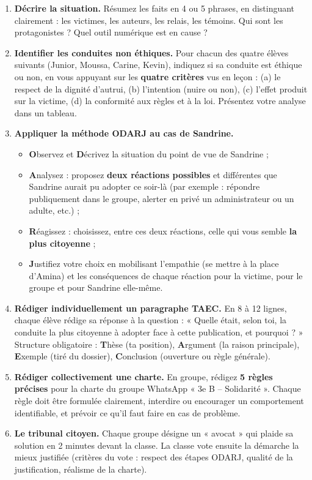 \documentclass[11pt]{article}
\newcommand{\cle}[1]{{\popxbold\color{popdark}#1}}
\begin{document}
\begin{enumerate}
\item \textbf{Décrire la situation.} Résumez les faits en 4 ou 5 phrases, en distinguant clairement : les victimes, les auteurs, les relais, les témoins. Qui sont les protagonistes ? Quel outil numérique est en cause ?

\item \textbf{Identifier les conduites non éthiques.} Pour chacun des quatre élèves suivants (Junior, Moussa, Carine, Kevin), indiquez si sa conduite est éthique ou non, en vous appuyant sur les \textbf{quatre critères} vus en leçon : (a) le respect de la dignité d'autrui, (b) l'intention (nuire ou non), (c) l'effet produit sur la victime, (d) la conformité aux règles et à la loi. Présentez votre analyse dans un tableau.

\item \textbf{Appliquer la méthode ODARJ au cas de Sandrine.}
\begin{itemize}
\item \textbf{O}bservez et \textbf{D}écrivez la situation du point de vue de Sandrine ;
\item \textbf{A}nalysez : proposez \textbf{deux réactions possibles} et différentes que Sandrine aurait pu adopter ce soir-là (par exemple : répondre publiquement dans le groupe, alerter en privé un administrateur ou un adulte, etc.) ;
\item \textbf{R}éagissez : choisissez, entre ces deux réactions, celle qui vous semble \textbf{la plus citoyenne} ;
\item \textbf{J}ustifiez votre choix en mobilisant l'\cle{empathie} (se mettre à la place d'Amina) et les conséquences de chaque réaction pour la victime, pour le groupe et pour Sandrine elle-même.
\end{itemize}

\item \textbf{Rédiger individuellement un paragraphe TAEC.} En 8 à 12 lignes, chaque élève rédige sa réponse à la question : « Quelle était, selon toi, la conduite la plus citoyenne à adopter face à cette publication, et pourquoi ? » Structure obligatoire : \textbf{T}hèse (ta position), \textbf{A}rgument (la raison principale), \textbf{E}xemple (tiré du dossier), \textbf{C}onclusion (ouverture ou règle générale).

\item \textbf{Rédiger collectivement une charte.} En groupe, rédigez \textbf{5 règles précises} pour la charte du groupe WhatsApp « 3e B – Solidarité ». Chaque règle doit être formulée clairement, interdire ou encourager un comportement identifiable, et prévoir ce qu'il faut faire en cas de problème.

\item \textbf{Le tribunal citoyen.} Chaque groupe désigne un « avocat » qui plaide sa solution en 2 minutes devant la classe. La classe vote ensuite la démarche la mieux justifiée (critères du vote : respect des étapes ODARJ, qualité de la justification, réalisme de la charte).
\end{enumerate}
\end{document}
